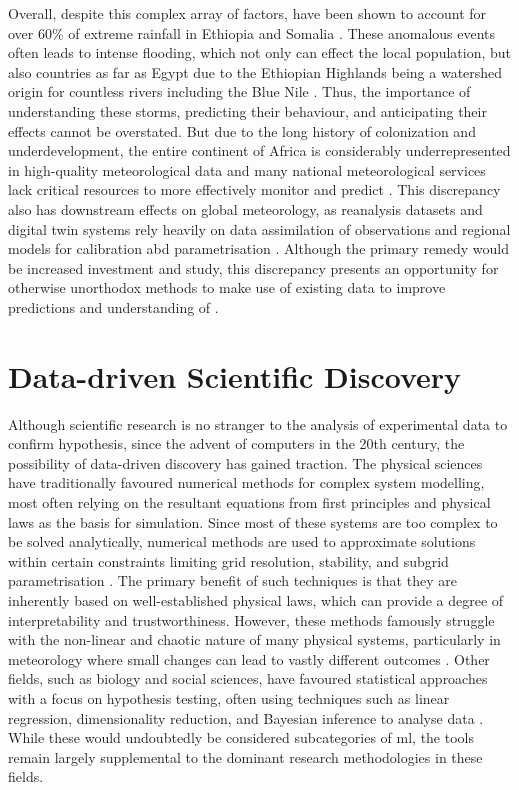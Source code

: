 Overall, despite this complex array of factors,  have been shown to account for over 60\% of extreme rainfall in Ethiopia and Somalia \citep{Hill2023}. These anomalous events often leads to intense flooding, which not only can effect the local population, but also countries as far as Egypt due to the Ethiopian Highlands being a watershed origin for countless rivers including the Blue Nile \citep{Legese2020,Zaroug2014}. Thus, the importance of understanding these storms, predicting their behaviour, and anticipating their effects cannot be overstated. But due to the long history of colonization and underdevelopment, the entire continent of Africa is considerably underrepresented in high-quality meteorological data and many national meteorological services lack critical resources to more effectively monitor and predict  \citep{Dinku2019,Kinyondo2018,Meque2021}. This discrepancy also has downstream effects on global meteorology, as reanalysis datasets and digital twin systems rely heavily on data assimilation of observations and regional models for calibration abd parametrisation \citep{Linsenmeier2023,Valmassoi2023}. Although the primary remedy would be increased investment and study, this discrepancy presents an opportunity for otherwise unorthodox methods to make use of existing data to improve predictions and understanding of .

\section{Data-driven Scientific Discovery}

Although scientific research is no stranger to the analysis of experimental data to confirm hypothesis, since the advent of computers in the 20th century, the possibility of data-driven discovery has gained traction. The physical sciences have traditionally favoured numerical methods for complex system modelling, most often relying on the resultant equations from first principles and physical laws as the basis for simulation. Since most of these systems are too complex to be solved analytically, numerical methods are used to approximate solutions within certain constraints limiting grid resolution, stability, and subgrid parametrisation \citep{Lynch2008}. The primary benefit of such techniques is that they are inherently based on well-established physical laws, which can provide a degree of interpretability and trustworthiness. However, these methods famously struggle with the non-linear and chaotic nature of many physical systems, particularly in meteorology where small changes can lead to vastly different outcomes \citep{Lorenz1963}. Other fields, such as biology and social sciences, have favoured statistical approaches with a focus on hypothesis testing, often using techniques such as linear regression, dimensionality reduction, and Bayesian inference to analyse data . While these would undoubtedly be considered subcategories of \acrshort{ml}, the tools remain largely supplemental to the dominant research methodologies in these fields.

